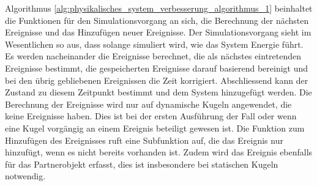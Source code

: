 Algorithmus \ref{alg:physikalisches_system_verbesserung_algorithmus_1} beinhaltet die Funktionen für den Simulationsvorgang
an sich, die Berechnung der nächsten Ereignisse und das Hinzufügen neuer Ereignisse. Der Simulationsvorgang sieht im
Wesentlichen so aus, dass solange simuliert wird, wie das System Energie führt. Es werden nacheinander die Ereignisse berechnet,
die als nächstes eintretenden Ereignisse bestimmt, die gespeicherten Ereignisse darauf basierend bereinigt und bei den übrig
gebliebenen Ereignissen die Zeit korrigiert. Abschliessend kann der Zustand zu diesem Zeitpunkt bestimmt und
dem System hinzugefügt werden. Die Berechnung der Ereignisse wird nur auf dynamische Kugeln angewendet, die keine Ereignisse haben.
Dies ist bei der ersten Ausführung der Fall oder wenn eine Kugel vorgängig an einem Ereignis beteiligt gewesen ist.
Die Funktion zum Hinzufügen des Ereignisses ruft eine Subfunktion auf, die das Ereignis nur hinzufügt, wenn es nicht bereits vorhanden ist.
Zudem wird das Ereignis ebenfalls für das Partnerobjekt erfasst, dies ist insbesondere bei statischen Kugeln notwendig.

